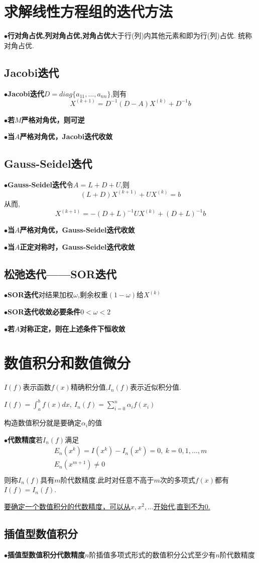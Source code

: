 \documentclass[UTF8]{article}
\newcommand{\keypoint}[2]{$\bullet$\textbf{#1}\quad#2\par}
\begin{document}
\section{求解线性方程组的迭代方法}
\keypoint{行对角占优,列对角占优,对角占优}{大于行(列)内其他元素和即为行(列)占优. 统称对角占优.}
\subsection{Jacobi迭代}
\keypoint{Jacobi迭代}{$D=diag\{a_{11},\dots,a_{nn}\}$,则有$$X^{(k+1)}=D^{-1}(D-A)X^{(k)}+D^{-1}b$$}
\keypoint{若$M$严格对角优，则可逆}{}
\keypoint{当$A$严格对角优，Jacobi迭代收敛}{}
\subsection{Gauss-Seidel迭代}
\keypoint{Gauss-Seidel迭代}{令$A=L+D+U$,则$$(L+D)X^{(k+1)}+UX^{(k)}=b$$从而,$$X^{(k+1)}=-(D+L)^{-1}UX^{(k)}+(D+L)^{-1}b$$}
\keypoint{当$A$严格对角优，Gauss-Seidel迭代收敛}{}
\keypoint{当$A$正定对称时，Gauss-Seidel迭代收敛}{}
\subsection{松弛迭代——SOR迭代}
\keypoint{SOR迭代}{对结果加权$\omega$,剩余权重$(1-\omega)$给$X^{(k)}$}
\keypoint{SOR迭代收敛必要条件}{$0<\omega<2$}
\keypoint{若$A$对称正定，则在上述条件下恒收敛}{}



\section{数值积分和数值微分}
$I(f)$表示函数$f(x)$精确积分值,$I_n(f)$表示近似积分值.\par
$I(f)=\int_{a}^{b}f(x)dx,\ I_n(f)=\sum\limits_{i=0}^{n}\alpha_if(x_i)$\par
构造数值积分就是要确定$\alpha_i$的值\par
\keypoint{代数精度}{若$I_n(f)$满足
	$$
	\begin{array}{c}
	E_n(x^k)=I(x^k)-I_n(x^k)=0,\ k=0,1,\dots,m\\
	E_n(x^{m+1})\not=0\\
	\end{array}
	$$
	则称$I_n(f)$具有$m$阶代数精度.此时对任意不高于$m$次的多项式$f(x)$都有$I(f)=I_n(f)$.
}
\underline{要确定一个数值积分的代数精度，可以从$x,x^2,\dots$开始代,直到不为0.}\par
\subsection{插值型数值积分}
\keypoint{插值型数值积分代数精度}{$n$阶插值多项式形式的数值积分公式至少有$n$阶代数精度}
\end{document}
